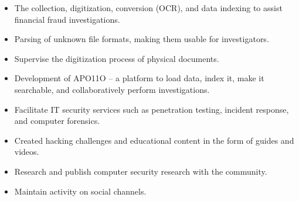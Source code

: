 \documentclass[10pt,a4paper,ragged2e,withhyper]{altacv}
\begin{document}
\begin{paracol}{2}
\newpage

\begin{itemize}
\item The collection, digitization, conversion (OCR), and data indexing to assist financial fraud investigations.
\item Parsing of unknown file formats, making them usable for investigators.
\item Supervise the digitization process of physical documents.
\end{itemize}

\divider
\vspace{0.5em}

\begin{itemize}
\item Development of APO11O -- a platform to load data, index it, make it searchable, and collaboratively perform investigations.
\item Facilitate IT security services such as penetration testing, incident response, and computer forensics.
\end{itemize}

\divider
\vspace{0.5em}

\begin{itemize}
\item Created hacking challenges and educational content in the form of guides and videos.
\item Research and publish computer security research with the community.
\item Maintain activity on social channels.
\end{itemize}

\newpage

\switchcolumn


\\
\\

\divider\smallskip
\vspace{0.5em}



\end{paracol}
\end{document}
